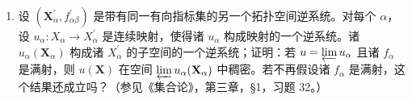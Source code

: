 \begin{enumerate}
\def\labelenumi{\alph{enumi})}
\setcounter{enumi}{1}
\tightlist
\item
  设 \((\mathbf{X}_{\alpha}^{\prime}, f_{\alpha\beta}^{\prime})\) 是带有同一有向指标集的另一个拓扑空间逆系统。对每个 \(\alpha\)，设 \(u_{\alpha}: X_{\alpha} \to X_{\alpha}^{\prime}\) 是连续映射，使得诸 \(u_{\alpha}\) 构成映射的一个逆系统。诸 \(u_{\alpha}(\mathbf{X}_{\alpha})\) 构成诸 \(X_{\alpha}^{\prime}\) 的子空间的一个逆系统；证明：若 \(u = \varprojlim u_{\alpha}\) 且诸 \(f_{\alpha}\) 是满射，则 \(u(\mathbf{X})\) 在空间 \(\varprojlim u_{\alpha}(\mathbf{X}_{\alpha})\) 中稠密。若不再假设诸 \(f_{\alpha}\) 是满射，这个结果还成立吗？（参见《集合论》，第三章，§1，习题 32。）
\end{enumerate}

